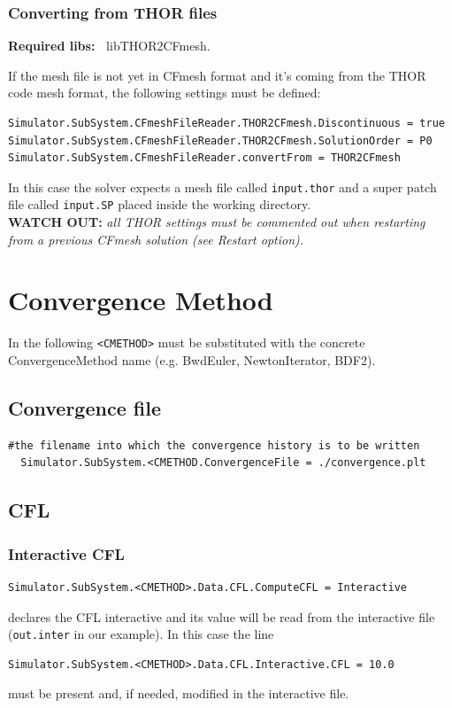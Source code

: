 \documentclass[11pt]{article}
\begin{document}
\subsubsection{Converting from THOR files}

{\bf Required libs:~} libTHOR2CFmesh.

If the mesh file is not yet in CFmesh format and it's coming from the THOR code mesh format,
the following settings must be defined:

\begin{lstlisting}[breaklines]
Simulator.SubSystem.CFmeshFileReader.THOR2CFmesh.Discontinuous = true
Simulator.SubSystem.CFmeshFileReader.THOR2CFmesh.SolutionOrder = P0
Simulator.SubSystem.CFmeshFileReader.convertFrom = THOR2CFmesh
\end{lstlisting}
In this case the solver expects a mesh file called {\tt input.thor} and a super patch file called {\tt input.SP} placed inside the working directory.\\
{\bf WATCH OUT:} {\it all THOR settings must be commented out when restarting from a previous CFmesh solution
  (see Restart option).}

\section{Convergence Method}

In the following {\tt <CMETHOD>} must be substituted with the concrete ConvergenceMethod name (e.g. BwdEuler, NewtonIterator, BDF2).

\subsection{Convergence file}

\begin{lstlisting}[breaklines]
  #the filename into which the convergence history is to be written
  Simulator.SubSystem.<CMETHOD.ConvergenceFile = ./convergence.plt
\end{lstlisting}

\subsection{CFL}
 
\subsubsection{Interactive CFL}

\begin{lstlisting}[breaklines]   
Simulator.SubSystem.<CMETHOD>.Data.CFL.ComputeCFL = Interactive
\end{lstlisting}
declares the CFL interactive and its value will be read from the interactive file ({\tt out.inter} in our example).
In this case the line
\begin{lstlisting}[breaklines]
Simulator.SubSystem.<CMETHOD>.Data.CFL.Interactive.CFL = 10.0
\end{lstlisting}
must be present and, if needed, modified in the interactive file.
\end{document}
